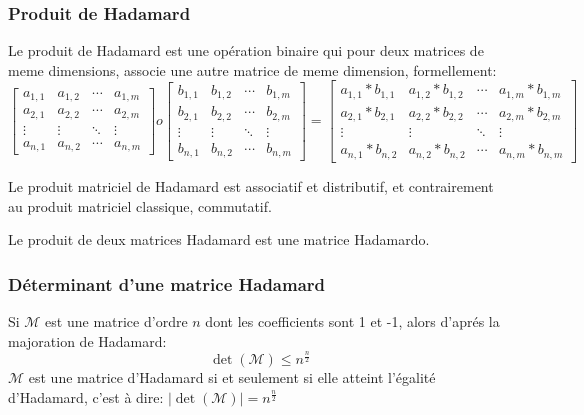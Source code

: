 \documentclass{article}
\begin{document}
\subsubsection{Produit de Hadamard}

Le produit de Hadamard est une opération binaire qui pour deux matrices de
meme dimensions, associe une autre matrice de meme dimension, formellement:
\begin{equation*}
	\begin{bmatrix}
		a_{1,1} & a_{1,2} & \cdots & a_{1,m}\\
		a_{2,1} & a_{2,2} & \cdots & a_{2,m}\\
		\vdots & \vdots & \ddots & \vdots\\
		a_{n,1} & a_{n,2} & \cdots & a_{n,m}
	\end{bmatrix}
	o
	\begin{bmatrix}
		b_{1,1} & b_{1,2} & \cdots & b_{1,m}\\
		b_{2,1} & b_{2,2} & \cdots & b_{2,m}\\
		\vdots & \vdots & \ddots & \vdots\\
		b_{n,1} & b_{n,2} & \cdots & b_{n,m}
	\end{bmatrix}
	=
	\begin{bmatrix}
		a_{1,1}*b_{1,1} & a_{1,2}*b_{1,2} & \cdots & a_{1,m}*b_{1,m}\\
		a_{2,1}*b_{2,1} & a_{2,2}*b_{2,2} & \cdots & a_{2,m}*b_{2,m}\\
		\vdots & \vdots & \ddots & \vdots\\
		a_{n,1}*b_{n,2} & a_{n,2}*b_{n,2} & \cdots & a_{n,m}*b_{n,m}
	\end{bmatrix}
\end{equation*}

Le produit matriciel de Hadamard est associatif et distributif, et 
contrairement au produit matriciel classique, commutatif. 

Le produit de deux matrices Hadamard est une matrice Hadamardo.

\subsubsection{Déterminant d'une matrice Hadamard}

Si $\mathcal{M}$ est une matrice d'ordre $n$ dont les coefficients sont 1 
et -1, alors d'aprés la majoration de Hadamard:
\begin{equation}
	\det(\mathcal{M}) \leq n^{\frac{n}{2}}
\end{equation}
$\mathcal{M}$ est une matrice d'Hadamard si et seulement si elle atteint 
l'égalité d'Hadamard, c'est à dire: 
$|\det(\mathcal{M})| = n^{\frac{n}{2}}$
\end{document}
